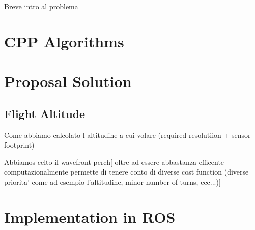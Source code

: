 Breve intro al problema

\section{CPP Algorithms} %
\label{sec:cpp_algorithms}


\section{Proposal Solution} %
\label{sec:proposal_solution}
\subsection{Flight Altitude} %

Come abbiamo calcolato l-altitudine a cui volare (required resolutiion + sensor footprint)
\label{sub:flight_altitude}

Abbiamos celto il wavefront perch[ oltre ad essere abbastanza efficente computazionalmente permette di tenere conto di diverse cost function (diverse priorita' come ad esempio l'altitudine, minor number of turns, ecc...)]


\section{Implementation in ROS} %
\label{sec:implementation_in_ros}


